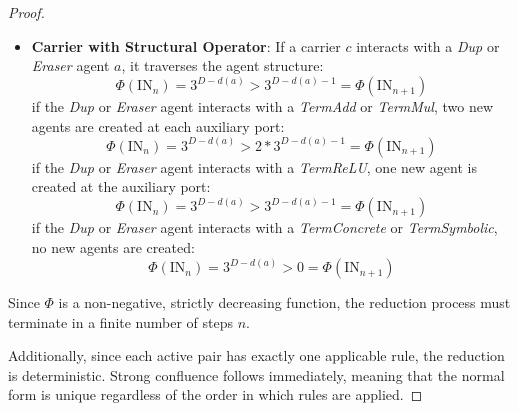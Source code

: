 \begin{proof}
\begin{itemize}
\begin{equation}
			\begin{aligned}
				\Phi(\text{IN}_n) &= 3 + 3^{D-d(i)} \\
				&> 1 + 3^{D-d(i)-2} + 1 + 3^{D-d(i)-2} \\
				&= 2 + 2 \cdot 3^{D-d(i)-2} = \Phi(\text{IN}_{n+1})
			\end{aligned}
			\end{equation}
			If the carrier $c$ interacts with a \textit{Materialize} agent $i$:
			\begin{equation}
			\Phi(\text{IN}_n) = 1 + 3^{D-d(i)} > 0 = \Phi(\text{IN}_{n+1})
			\end{equation}
		\item \textbf{Carrier with Structural Operator}: If a carrier $c$ interacts with a \textit{Dup} or \textit{Eraser}
			agent $a$, it traverses the agent structure:
			\begin{equation}
			\Phi(\text{IN}_n) = 3^{D-d(a)} > 3^{D-d(a)-1} = \Phi(\text{IN}_{n+1})
			\end{equation}
			if the \textit{Dup} or \textit{Eraser} agent interacts with a \textit{TermAdd} or \textit{TermMul}, two new agents are created at
			each auxiliary port:
			\begin{equation}
			\Phi(\text{IN}_n) = 3^{D-d(a)} > 2 * 3^{D-d(a)-1} = \Phi(\text{IN}_{n+1})
			\end{equation}
			if the \textit{Dup} or \textit{Eraser} agent interacts with a \textit{TermReLU}, one new agent is created at the 
			auxiliary port:
			\begin{equation}
			\Phi(\text{IN}_n) = 3^{D-d(a)} > 3^{D-d(a)-1} = \Phi(\text{IN}_{n+1})
			\end{equation}
			if the \textit{Dup} or \textit{Eraser} agent interacts with a \textit{TermConcrete} or \textit{TermSymbolic}, no new agents are
			created:
			\begin{equation}
			\Phi(\text{IN}_n) = 3^{D-d(a)} > 0 = \Phi(\text{IN}_{n+1})
			\end{equation}
	\end{itemize}
	Since $\Phi$ is a non-negative, strictly decreasing function, the reduction
	process must terminate in a finite number of steps $n$.

	Additionally, since each active pair has exactly one applicable rule, the reduction is
	deterministic. Strong confluence follows immediately, meaning that the normal form is unique
	regardless of the order in which rules are applied.
\end{proof}
